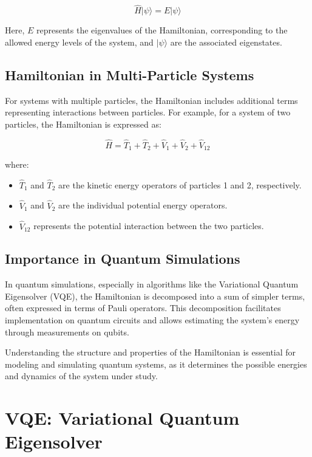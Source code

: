 \[
\hat{H} |\psi\rangle = E |\psi\rangle
\]

Here, \( E \) represents the eigenvalues of the Hamiltonian, corresponding to the allowed energy levels of the system, and \( |\psi\rangle \) are the associated eigenstates.

\subsection{Hamiltonian in Multi-Particle Systems}

For systems with multiple particles, the Hamiltonian includes additional terms representing interactions between particles. For example, for a system of two particles, the Hamiltonian is expressed as:

\[
\hat{H} = \hat{T}_1 + \hat{T}_2 + \hat{V}_1 + \hat{V}_2 + \hat{V}_{12}
\]

where:

\begin{itemize}
    \item \( \hat{T}_1 \) and \( \hat{T}_2 \) are the kinetic energy operators of particles 1 and 2, respectively.
    \item \( \hat{V}_1 \) and \( \hat{V}_2 \) are the individual potential energy operators.
    \item \( \hat{V}_{12} \) represents the potential interaction between the two particles.
\end{itemize}

\subsection{Importance in Quantum Simulations}

In quantum simulations, especially in algorithms like the Variational Quantum Eigensolver (VQE), the Hamiltonian is decomposed into a sum of simpler terms, often expressed in terms of Pauli operators. This decomposition facilitates implementation on quantum circuits and allows estimating the system's energy through measurements on qubits.

Understanding the structure and properties of the Hamiltonian is essential for modeling and simulating quantum systems, as it determines the possible energies and dynamics of the system under study.

\section{VQE: Variational Quantum Eigensolver}
\label{sec:vqe}

